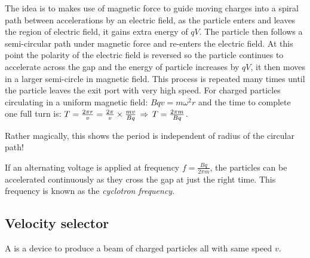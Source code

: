 The idea is to makes use of magnetic force to guide moving charges into a spiral path between accelerations by an electric field, as the particle enters and leaves the region of electric field, it gains extra energy of $qV$. The particle then follows a semi-circular path under magnetic force and re-enters the electric field. At this point the polarity of the electric field is reversed so the particle continues to accelerate across the gap and the energy of particle increases by $qV$, it then moves in a larger semi-circle in magnetic field. This process is repeated many times until the particle leaves the exit port with very high speed.
For charged particles circulating in a uniform magnetic field: $Bqv=m\omega^2 r$ and the time to complete one full turn is: $T=\frac{2\pi r}{v} = \frac{2\pi}{v}\times\frac{mv}{Bq}\, \Rightarrow \, T=\frac{2\pi m}{Bq}$.

Rather magically, this shows the period is independent of radius of the circular path!

If an alternating voltage is applied at frequency $f=\frac{Bq}{2\pi m}$, the particles can be accelerated continuously as they cross the gap at just the right time. This frequency is known as the \emph{cyclotron frequency}.



\subsection{Velocity selector}

A  is a device to produce a beam of charged particles all with same speed $v$.

